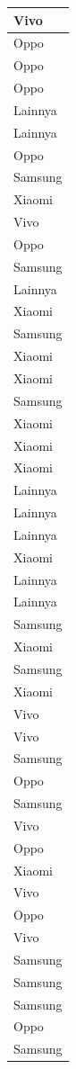 \documentclass[
  letterpaper,
  DIV=11,
  numbers=noendperiod]{scrartcl}
\begin{document}
\begin{table}
\begin{tabular}[t]{l}
\hline
Vivo\\
\hline
Oppo\\
\hline
Oppo\\
\hline
Oppo\\
\hline
Lainnya\\
\hline
Lainnya\\
\hline
Oppo\\
\hline
Samsung\\
\hline
Xiaomi\\
\hline
Vivo\\
\hline
Oppo\\
\hline
Samsung\\
\hline
Lainnya\\
\hline
Xiaomi\\
\hline
Samsung\\
\hline
Xiaomi\\
\hline
Xiaomi\\
\hline
Samsung\\
\hline
Xiaomi\\
\hline
Xiaomi\\
\hline
Xiaomi\\
\hline
Lainnya\\
\hline
Lainnya\\
\hline
Lainnya\\
\hline
Xiaomi\\
\hline
Lainnya\\
\hline
Lainnya\\
\hline
Samsung\\
\hline
Xiaomi\\
\hline
Samsung\\
\hline
Xiaomi\\
\hline
Vivo\\
\hline
Vivo\\
\hline
Samsung\\
\hline
Oppo\\
\hline
Samsung\\
\hline
Vivo\\
\hline
Oppo\\
\hline
Xiaomi\\
\hline
Vivo\\
\hline
Oppo\\
\hline
Vivo\\
\hline
Samsung\\
\hline
Samsung\\
\hline
Samsung\\
\hline
Oppo\\
\hline
Samsung\\

\end{tabular}
\end{table}
\end{document}
